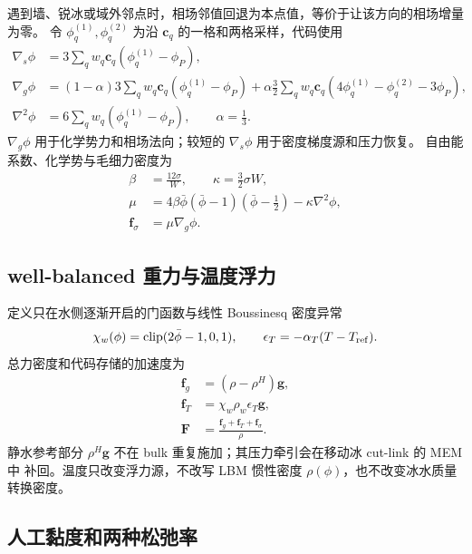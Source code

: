 \documentclass[UTF8,zihao=-4]{ctexart}
\newcommand{\vect}[1]{\boldsymbol{#1}}
\newcommand{\clip}{\operatorname{clip}}
\numberwithin{equation}{section}
\begin{document}
遇到墙、锐冰或域外邻点时，相场邻值回退为本点值，等价于让该方向的相场增量为零。
令 $\phi_q^{(1)},\phi_q^{(2)}$ 为沿 $\vect c_q$ 的一格和两格采样，代码使用
\begin{align}
  \nabla_s\phi&=3\sum_qw_q\vect c_q(\phi_q^{(1)}-\phi_P),\\
  \nabla_g\phi&=(1-\alpha)3\sum_qw_q\vect c_q(\phi_q^{(1)}-\phi_P)
  +\alpha\frac32\sum_qw_q\vect c_q(4\phi_q^{(1)}-\phi_q^{(2)}-3\phi_P),\\
  \nabla^2\phi&=6\sum_qw_q(\phi_q^{(1)}-\phi_P),
  \qquad \alpha=\frac13.
  \label{eq:phase-stencils}
\end{align}
$\nabla_g\phi$ 用于化学势力和相场法向；较短的 $\nabla_s\phi$ 用于密度梯度源和压力恢复。
自由能系数、化学势与毛细力密度为
\begin{align}
  \beta&=\frac{12\sigma}{W},\qquad \kappa=\frac32\sigma W,\\
  \mu&=4\beta\bar\phi(\bar\phi-1)(\bar\phi-\tfrac12)-\kappa\nabla^2\phi,\\
  \vect f_\sigma&=\mu\nabla_g\phi.
  \label{eq:chemical-force}
\end{align}

\subsection{well-balanced 重力与温度浮力}

定义只在水侧逐渐开启的门函数与线性 Boussinesq 密度异常
\begin{equation}
  \chi_w(\phi)=\clip(2\bar\phi-1,0,1),
  \qquad \epsilon_T=-\alpha_T(T-T_{\rm ref}).
\end{equation}
总力密度和代码存储的加速度为
\begin{align}
  \vect f_g&=(\rho-\rho^H)\vect g,\\
  \vect f_T&=\chi_w\rho_w\epsilon_T\vect g,\\
  \vect F&=\frac{\vect f_g+\vect f_T+\vect f_\sigma}{\rho}.
  \label{eq:total-lattice-acceleration}
\end{align}
静水参考部分 $\rho^H\vect g$ 不在 bulk 重复施加；其压力牵引会在移动冰 cut-link 的 MEM 中
补回。温度只改变浮力源，不改写 LBM 惯性密度 $\rho(\phi)$，也不改变冰水质量转换密度。

\subsection{人工黏度和两种松弛率}
\end{document}
